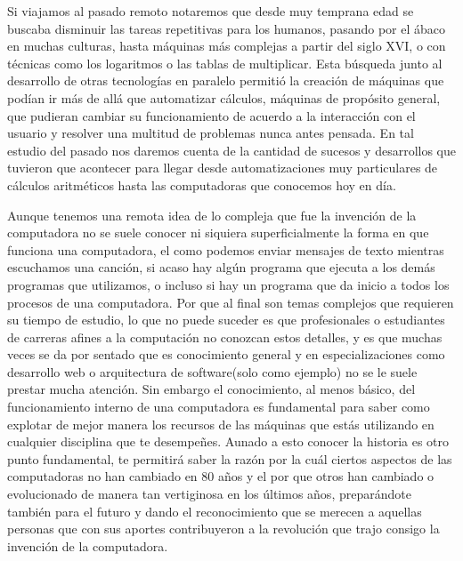 \documentclass[letterpaper,12pt,oneside]{book}
\begin{document}
	Si viajamos al pasado remoto notaremos que desde muy temprana edad se buscaba disminuir las tareas repetitivas para los humanos, pasando por el ábaco
	en muchas culturas, hasta máquinas más complejas a partir del siglo XVI, o con técnicas como los logaritmos o las tablas de multiplicar. Esta búsqueda junto
	al desarrollo de otras tecnologías en paralelo permitió la creación de máquinas que podían ir más de allá que automatizar cálculos,
	máquinas de propósito general, que pudieran cambiar su funcionamiento de acuerdo a la interacción con el usuario y resolver
	una multitud de problemas nunca antes pensada\cite{ifrah_universal_2001}. En tal estudio del pasado nos daremos cuenta de la cantidad de sucesos y desarrollos que tuvieron 
	que acontecer para llegar desde automatizaciones muy particulares de cálculos aritméticos hasta las computadoras que conocemos hoy en día. 

	Aunque tenemos una remota idea de lo compleja que fue la invención de la computadora no se suele conocer ni siquiera superficialmente
	la forma en que funciona una computadora, el como podemos enviar mensajes de texto mientras escuchamos una canción, si acaso hay algún programa que ejecuta a los 
	demás programas que utilizamos, o incluso si hay un programa que da inicio a todos los procesos de una computadora. Por que al final son temas complejos
	que requieren su tiempo de estudio, lo que no puede suceder es que profesionales o estudiantes de carreras afines a la computación no conozcan estos detalles, y
	es que muchas veces se da por sentado que es conocimiento general y en especializaciones como desarrollo web o arquitectura de software(solo como ejemplo) no se le suele
	prestar mucha atención. Sin embargo el conocimiento, al menos básico, del funcionamiento interno de una computadora es fundamental para saber
	como explotar de mejor manera los recursos de las máquinas que estás utilizando en cualquier disciplina que te desempeñes. Aunado a esto conocer la historia
	es otro punto fundamental,
	te permitirá saber la razón por la cuál ciertos aspectos de las computadoras no han cambiado en 80 años y el por que otros han cambiado o evolucionado
	de manera tan vertiginosa en los últimos años, preparándote también para el futuro y dando el reconocimiento que se merecen a aquellas personas que
	con sus aportes contribuyeron a la revolución que trajo consigo la invención de la computadora.
	
\end{document}
